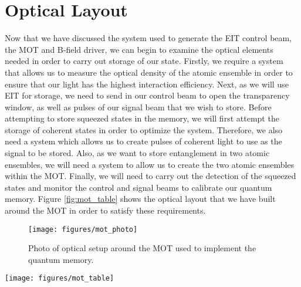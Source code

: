   
\section{Optical Layout} 

Now that we have discussed the system used to generate the EIT control beam, the
MOT and B-field driver, we can begin to examine the optical elements needed in
order to carry out storage of our state.  Firstly, we require a system that
allows us to measure the optical density of the atomic ensemble in order to
ensure that our light has the highest interaction efficiency.  Next, as we will
use EIT for storage, we need to send in our control beam to open the
transparency window, as well as pulses of our signal beam that we wish to store.
Before attempting to store squeezed states in the memory, we will first attempt
the storage of coherent states in order to optimize the system. Therefore, we
also need a system which allows us to create pulses of coherent light to use as
the signal to be stored.  Also, as we want to store entanglement in two atomic ensembles, we will need a system to allow us to create the two atomic ensembles within the MOT.  Finally, we will need to carry out the detection of the squeezed states and monitor the control and signal beams to calibrate our quantum memory.  Figure \ref{fig:mot_table} shows the optical layout that we have built around the MOT in order to satisfy these requirements.

\begin{figure}[!ht] 
 \centering 
 \texttt{[image: figures/mot\_photo]} 
 \caption[Photo of MOT layout]{Photo of optical setup around the MOT used to implement the quantum memory.} 
 \label{fig:mot_photo} 
\end{figure}

\begin{sidewaysfigure}
 \centering 
 \hspace{-10em} 
 \texttt{[image: figures/mot\_table]} 
 \caption[Optical layout for MOT]{Optical diagram of MOT supporting optics.  The control section shows the output and monitoring of the control beam.  The signal section allows us to interchange a squeezed state with a coherent state.  The detection area mixes the MOT signal output with a LO for homodyne detection. The beam displacers near the MOT allow us to create two memories.  The photodiodes in the Optical Density section allow us to measure the optical density, and carry out the Raman spectroscopy.} 
 \label{fig:mot_table} 
\end{sidewaysfigure}

